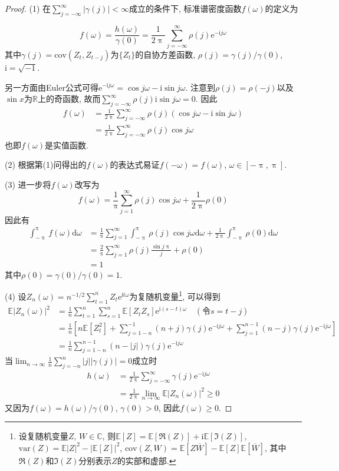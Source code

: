 \documentclass[cn,12pt,math=mtpro2,citestyle=gb7714-2015,bibstyle=gb7714-2015,twocol,mode=simple]{elegantbook}
\newcommand{\E}{\mathbb{E}}
\newcommand{\var}{\text{var}}
\begin{document}
\begin{proof}
  (1) 在$\displaystyle\sum_{j=-\infty}^{\infty}|\gamma(j)|<\infty$成立的条件下, 标准谱密度函数$f(\omega)$的定义为

  $$f(\omega)=\frac{h(\omega)}{\gamma(0)}=\frac{1}{2\uppi}\sum_{j=-\infty}^{\infty}\rho(j)\text{e}^{-\text{i}j\omega}$$
  其中$\gamma(j)=\text{cov}(Z_t,Z_{t-j})$为$\{Z_t\}$的自协方差函数, $\rho(j)=\gamma(j)/\gamma(0)$, $\text{i}=\sqrt{-1}$.

  另一方面由Euler公式可得$\text{e}^{-\text{i}j\omega}=\cos j\omega-\text{i}\sin j\omega$. 注意到$\rho(j)=\rho(-j)$以及$\sin x$为$\mathbb{R}$上的奇函数, 故而$\displaystyle \sum_{j=-\infty}^{\infty}\rho(j)\text{i}\sin j\omega=0$. 因此
  \begin{align*}
  f(\omega)&=\frac{1}{2\uppi}\sum_{j=-\infty}^{\infty}\rho(j)(\cos j\omega-\text{i}\sin j\omega) \\
  &=\frac{1}{2\uppi}\sum_{j=-\infty}^{\infty}\rho(j)\cos j\omega
  \end{align*}
   也即$f(\omega)$是实值函数.

  (2) 根据第(1)问得出的$f(\omega)$的表达式易证$f(-\omega)=f(\omega)$, $\omega\in[-\uppi,\uppi]$.

  (3) 进一步将$f(\omega)$改写为
  $$f(\omega)=\frac{1}{\uppi}\sum_{j=1}^{\infty}\rho(j)\cos j\omega+\frac{1}{2\uppi}\rho(0)$$
  因此有
  \begin{align*}
  \int_{-\uppi}^{\uppi}f(\omega)\text{d}\omega&=\frac{1}{\uppi}\sum_{j=1}^{\infty}\int_{-\uppi}^{\uppi}\rho(j)\cos j\omega \text{d}\omega+\frac{1}{2\uppi}\int_{-\uppi}^{\uppi}\rho(0)\text{d}\omega \\
  &=\frac{2}{\uppi}\sum_{j=1}^{\infty}\rho(j)\frac{\sin j\uppi}{j}+\rho(0) \\
  &=1
  \end{align*}
  其中$\rho(0)=\gamma(0)/\gamma(0)=1$.

  (4) 设$\displaystyle Z_n(\omega)=n^{-1/2}\sum_{t=1}^{n}Z_t\text{e}^{\text{i}t\omega} $为复随机变量\footnote{设复随机变量$Z$, $W \in \mathbb{C}$, 则$\E[Z]=\E[\mathfrak{R}(Z)]+\text{i}\E[\mathfrak{I}(Z)]$, $\var(Z)=\E|Z| ^2-|\E[Z]|^2$, $\text{cov}(Z,W)=\E[Z\overline{W}]-\E[Z]\E[\overline{W}]$, 其中$\mathfrak{R}(Z)$和$\mathfrak{I}(Z)$分别表示$Z$的实部和虚部.}, 可以得到
  \begin{align*}
  \E|Z_n(\omega)|^2&=\frac{1}{n}\sum_{t=1}^{n}\sum_{s=1}^{n}\E[Z_tZ_s]\text{e}^{\text{i}(s-t)\omega} \quad (\text{令}s=t-j) \\
  &=\frac{1}{n}\left[n\E[Z_t^2]+\sum_{j=1-n}^{-1}(n+j)\gamma(j)\text{e}^{-\text{i}j\omega}+\sum_{j=1}^{n-1}(n-j)\gamma(j)\text{e}^{-\text{i}j\omega}\right]\\
  &=\frac{1}{n}\sum_{j=1-n}^{n-1}(n-|j|)\gamma(j)\text{e}^{-\text{i}j\omega}
  \end{align*}
  当$\displaystyle\lim_{n\to\infty}\frac{1}{n}\sum_{j=-n}^{n}|j||\gamma(j)|=0$成立时
  \begin{align*}
  h(\omega)&=\frac{1}{2\uppi}\sum_{j=-\infty}^{\infty}\gamma(j)\text{e}^{-\text{i}j\omega}\\
  &=\frac{1}{2\uppi}\lim_{n\to\infty}\E|Z_n(\omega)|^2 \geq 0
  \end{align*}
  又因为$f(\omega)=h(\omega)/\gamma(0)$, $\gamma(0)>0$, 因此$f(\omega)\geq0$.


\end{proof}
\end{document}

